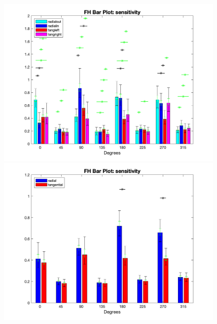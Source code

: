 \documentclass[11pt]{article} %
\begin{document}
\begin{figure}[H]
\centering %
\includegraphics[scale=.35]{Images/FH_BP_sensitivity_Alldata_4conds.png}
\includegraphics[scale=.35]{Images/FH_BP_sensitivity_Alldata_2conds.png}
\end{figure}
\end{document}
